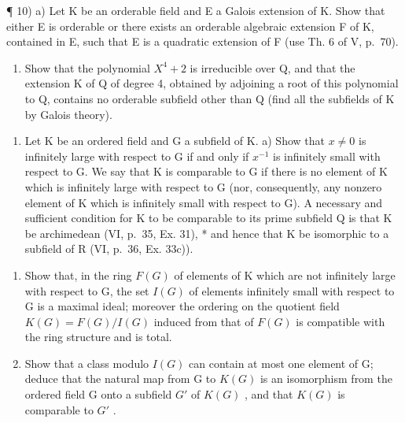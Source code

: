¶ 10) a) Let K be an orderable field and E a Galois extension of K. Show that either E is orderable or there exists an orderable algebraic extension F of K, contained in E, such that E is a quadratic extension of F (use Th. 6 of V, p.~70).

\begin{enumerate}
\def\labelenumi{\alph{enumi})}
\setcounter{enumi}{1}
\tightlist
\item
  Show that the polynomial \(X^{4} + 2\) is irreducible over Q, and that the extension K of Q of degree 4, obtained by adjoining a root of this polynomial to Q, contains no orderable subfield other than Q (find all the subfields of K by Galois theory).
\end{enumerate}

\begin{enumerate}
\def\labelenumi{\arabic{enumi})}
\setcounter{enumi}{10}
\tightlist
\item
  Let K be an ordered field and G a subfield of K. a) Show that \(x \neq 0\) is infinitely large with respect to G if and only if \(x^{-1}\) is infinitely small with respect to G. We say that K is comparable to G if there is no element of K which is infinitely large with respect to G (nor, consequently, any nonzero element of K which is infinitely small with respect to G). A necessary and sufficient condition for K to be comparable to its prime subfield Q is that K be archimedean (VI, p.~35, Ex. 31), * and hence that K be isomorphic to a subfield of R (VI, p.~36, Ex. 33c)).
\end{enumerate}

\begin{enumerate}
\def\labelenumi{\alph{enumi})}
\setcounter{enumi}{1}
\item
  Show that, in the ring \(F(G)\) of elements of K which are not infinitely large with respect to G, the set \(I(G)\) of elements infinitely small with respect to G is a maximal ideal; moreover the ordering on the quotient field \(K(G) = F(G)/I(G)\) induced from that of \(F(G)\) is compatible with the ring structure and is total.
\item
  Show that a class modulo \(I(G)\) can contain at most one element of G; deduce that the natural map from G to \(K(G)\) is an isomorphism from the ordered field G onto a subfield \(G'\) of \(K(G)\) , and that \(K(G)\) is comparable to \(G'\) .
\end{enumerate}

